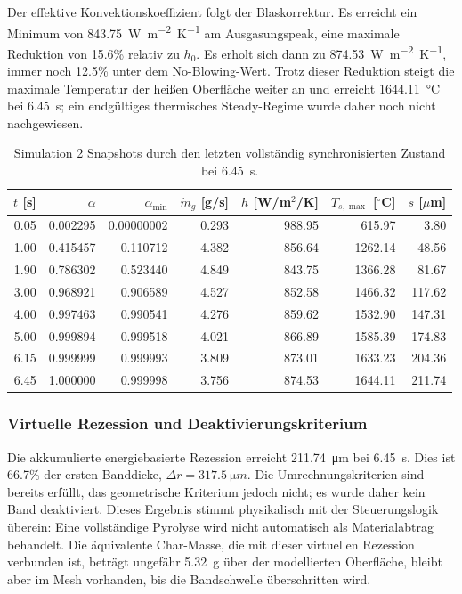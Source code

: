 \documentclass[oneside,openany]{amsdtx}
\begin{document}
Der effektive Konvektionskoeffizient folgt der Blaskorrektur. Es erreicht ein Minimum von \SI{843.75}{W.m^{-2}.K^{-1}} am Ausgasungspeak, eine maximale Reduktion von 15.6\% relativ zu \(h_0\). Es erholt sich dann zu \SI{874.53}{W.m^{-2}.K^{-1}}, immer noch 12.5\% unter dem No-Blowing-Wert. Trotz dieser Reduktion steigt die maximale Temperatur der heißen Oberfläche weiter an und erreicht \SI{1644.11}{\celsius} bei \SI{6.45}{s}; ein endgültiges thermisches Steady-Regime wurde daher noch nicht nachgewiesen.

\begin{table}[H]
\centering
\scriptsize
\renewcommand{\arraystretch}{1.16}
\begin{tabular}{rrrrrrr}
\toprule
\(t\) [s] & \(\bar\alpha\) & \(\alpha_\mathrm{min}\) &
\(\dot m_g\) [g/s] & \(h\) [W/m$^2$/K] &
\(T_{s,\max}\) [$^\circ$C] & \(s\) [$\mu$m] \\
\midrule
0.05 & 0.002295 & 0.00000002 & 0.293 & 988.95 & 615.97 & 3.80 \\
1.00 & 0.415457 & 0.110712 & 4.382 & 856.64 & 1262.14 & 48.56 \\
1.90 & 0.786302 & 0.523440 & 4.849 & 843.75 & 1366.28 & 81.67 \\
3.00 & 0.968921 & 0.906589 & 4.527 & 852.58 & 1466.32 & 117.62 \\
4.00 & 0.997463 & 0.990541 & 4.276 & 859.62 & 1532.90 & 147.31 \\
5.00 & 0.999894 & 0.999518 & 4.021 & 866.89 & 1585.39 & 174.83 \\
6.15 & 0.999999 & 0.999993 & 3.809 & 873.01 & 1633.23 & 204.36 \\
6.45 & 1.000000 & 0.999998 & 3.756 & 874.53 & 1644.11 & 211.74 \\
\bottomrule
\end{tabular}
\caption{Simulation 2 Snapshots durch den letzten vollständig synchronisierten Zustand bei \SI{6.45}{s}.}
\label{tab:sim2-results-snapshot}
\end{table}

\subsubsection{Virtuelle Rezession und Deaktivierungskriterium}

Die akkumulierte energiebasierte Rezession erreicht \SI{211.74}{\micro m} bei \SI{6.45}{s}. Dies ist 66.7\% der ersten Banddicke, \(\Delta r=\SI{317.5}{\micro m}\). Die Umrechnungskriterien sind bereits erfüllt, das geometrische Kriterium jedoch nicht; es wurde daher kein Band deaktiviert. Dieses Ergebnis stimmt physikalisch mit der Steuerungslogik überein: Eine vollständige Pyrolyse wird nicht automatisch als Materialabtrag behandelt. Die äquivalente Char-Masse, die mit dieser virtuellen Rezession verbunden ist, beträgt ungefähr \SI{5.32}{g} über der modellierten Oberfläche, bleibt aber im Mesh vorhanden, bis die Bandschwelle überschritten wird.
\end{document}
